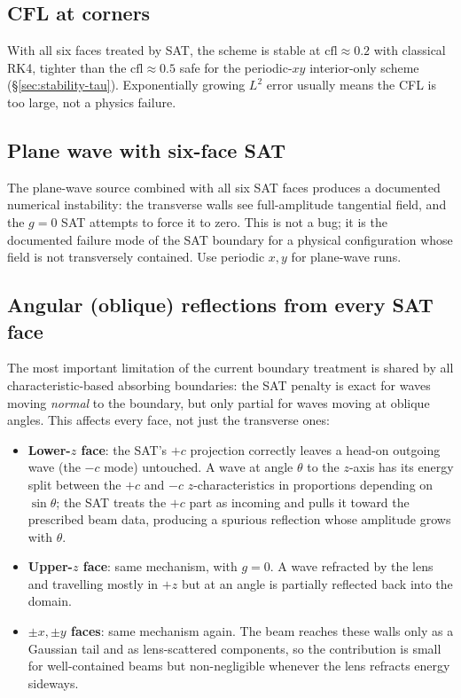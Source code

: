 \documentclass[11pt]{article}
\begin{document}
\subsection{CFL at corners}

With all six faces treated by SAT, the scheme is stable at
$\mathrm{cfl} \approx 0.2$ with classical RK4, tighter than the
$\mathrm{cfl} \approx 0.5$ safe for the periodic-$xy$
interior-only scheme (\S\ref{sec:stability-tau}).  Exponentially
growing $L^2$ error usually means the CFL is too large, not a
physics failure.

\subsection{Plane wave with six-face SAT}

The plane-wave source combined with all six SAT faces produces a
documented numerical instability: the transverse walls see
full-amplitude tangential field, and the $g = 0$ SAT attempts to
force it to zero.  This is not a bug; it is the documented
failure mode of the SAT boundary for a physical configuration
whose field is not transversely contained.  Use periodic $x, y$
for plane-wave runs.

\subsection{Angular (oblique) reflections from every SAT face}
\label{sec:oblique-reflection}

The most important limitation of the current boundary treatment is
shared by all characteristic-based absorbing boundaries: the SAT
penalty is exact for waves moving \emph{normal} to the boundary,
but only partial for waves moving at oblique angles.  This
affects every face, not just the transverse ones:
\begin{itemize}[itemsep=2pt,topsep=2pt]
  \item \textbf{Lower-$z$ face}: the SAT's $+c$ projection
        correctly leaves a head-on outgoing wave (the $-c$ mode)
        untouched.  A wave at angle $\theta$ to the $z$-axis has
        its energy split between the $+c$ and $-c$
        $z$-characteristics in proportions depending on
        $\sin\theta$; the SAT treats the $+c$ part as incoming and
        pulls it toward the prescribed beam data, producing a
        spurious reflection whose amplitude grows with $\theta$.
  \item \textbf{Upper-$z$ face}: same mechanism, with $g = 0$.  A
        wave refracted by the lens and travelling mostly in $+z$
        but at an angle is partially reflected back into the
        domain.
  \item \textbf{$\pm x, \pm y$ faces}: same mechanism again.  The
        beam reaches these walls only as a Gaussian tail and as
        lens-scattered components, so the contribution is small
        for well-contained beams but non-negligible whenever the
        lens refracts energy sideways.
\end{itemize}
\end{document}
